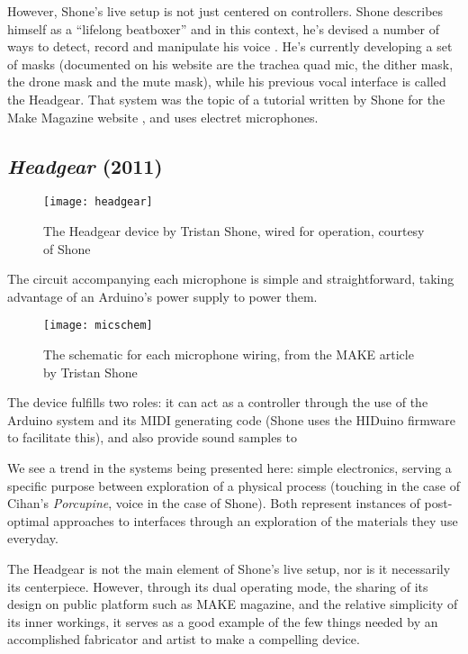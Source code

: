 However, Shone's live setup is not just centered on controllers. Shone describes himself as a ``lifelong beatboxer'' and in this context, he's devised a number of ways to detect, record and manipulate his voice \citep{shone2012}. He's currently developing a set of masks (documented on his website are the trachea quad mic, the dither mask, the drone mask and the mute mask), while his previous vocal interface is called the Headgear. That system was the topic of a tutorial written by Shone for the Make Magazine website \citep{shone2012}, and uses electret microphones. 

\subsection{ \textit{Headgear} (2011)}

	\begin{figure}[H]
	  \centering
	    \texttt{[image: headgear]}
	     \caption{The Headgear device by Tristan Shone, wired for operation, courtesy of Shone}
	\end{figure}
	
The circuit accompanying each microphone is simple and straightforward, taking advantage of an Arduino's power supply to power them.  

		\begin{figure}[H]
		  \centering
		    \texttt{[image: micschem]}
		     \caption{The schematic for each microphone wiring, from the MAKE article by Tristan Shone}
		\end{figure}
		
The device fulfills two roles: it can act as a controller through the use of the Arduino system and its MIDI generating code (Shone uses the HIDuino firmware to facilitate this), and also provide sound samples to 
	
We see a trend in the systems being presented here: simple electronics, serving a specific purpose between exploration of a physical process (touching in the case of Cihan's \emph{Porcupine}, voice in the case of Shone). Both represent instances of post-optimal approaches to interfaces through an exploration of the materials they use everyday. 
	
The Headgear is not the main element of Shone's live setup, nor is it necessarily its centerpiece. However, through its dual operating mode, the sharing of its design on public platform such as MAKE magazine, and the relative simplicity of its inner workings, it serves as a good example of the few things needed by an accomplished fabricator and artist to make a compelling device. 

